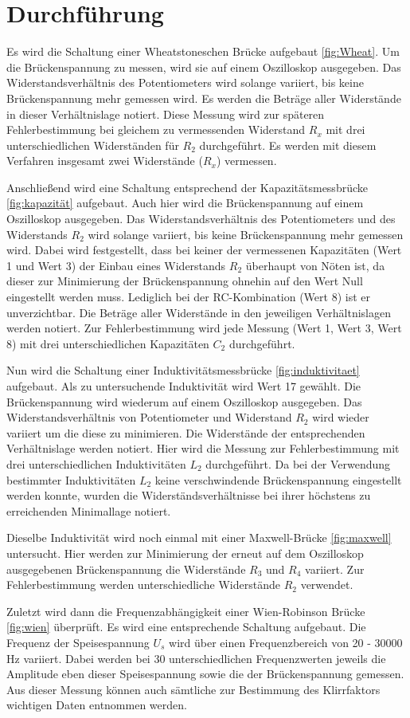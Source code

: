 \section{Durchführung}
\label{sec:Durchführung}

Es wird die Schaltung einer Wheatstoneschen Brücke aufgebaut \ref{fig:Wheat}.
Um die Brückenspannung zu messen, wird sie auf einem Oszilloskop ausgegeben.
Das Widerstandsverhältnis des Potentiometers wird solange variiert, bis keine
Brückenspannung mehr gemessen wird. Es werden die Beträge aller Widerstände in
dieser Verhältnislage notiert. Diese Messung wird zur späteren Fehlerbestimmung bei gleichem zu
vermessenden Widerstand $R_x$ mit drei unterschiedlichen Widerständen für $R_2$ durchgeführt.
Es werden mit diesem Verfahren insgesamt zwei Widerstände ($R_x$) vermessen.

Anschließend wird eine Schaltung entsprechend der Kapazitätsmessbrücke \ref{fig:kapazität}
aufgebaut. Auch hier wird die Brückenspannung auf einem Oszilloskop ausgegeben.
Das Widerstandsverhältnis des Potentiometers und des Widerstands $R_2$ wird solange variiert, bis keine
Brückenspannung mehr gemessen wird. Dabei wird festgestellt, dass bei keiner der
vermessenen Kapazitäten (Wert 1 und Wert 3) der Einbau eines Widerstands $R_2$
überhaupt von Nöten ist, da dieser zur Minimierung der Brückenspannung ohnehin auf
den Wert Null eingestellt werden muss. Lediglich bei der RC-Kombination (Wert 8)
ist er unverzichtbar. Die Beträge aller Widerstände in den jeweiligen Verhältnislagen
werden notiert. Zur Fehlerbestimmung wird jede Messung (Wert 1, Wert 3, Wert 8)
mit drei unterschiedlichen Kapazitäten $C_2$ durchgeführt.

Nun wird die Schaltung einer Induktivitätsmessbrücke \ref{fig:induktivitaet} aufgebaut.
Als zu untersuchende Induktivität wird Wert 17 gewählt.
Die Brückenspannung wird wiederum auf einem Oszilloskop ausgegeben.
Das Widerstandsverhältnis von Potentiometer und Widerstand $R_2$ wird wieder
variiert um die diese zu minimieren. Die Widerstände der entsprechenden
Verhältnislage werden notiert. Hier wird die Messung zur Fehlerbestimmung mit
drei unterschiedlichen Induktivitäten $L_2$ durchgeführt.
Da bei der Verwendung bestimmter Induktivitäten $L_2$ keine verschwindende
Brückenspannung eingestellt werden konnte, wurden die Widerständsverhältnisse
bei ihrer höchstens zu erreichenden Minimallage notiert.

Dieselbe Induktivität wird noch einmal mit einer Maxwell-Brücke \ref{fig:maxwell} untersucht.
Hier werden zur Minimierung der erneut auf dem Oszilloskop ausgegebenen Brückenspannung
die Widerstände $R_3$ und $R_4$ variiert. Zur Fehlerbestimmung werden unterschiedliche
Widerstände $R_2$ verwendet.

Zuletzt wird dann die Frequenzabhängigkeit einer Wien-Robinson Brücke \ref{fig:wien}
überprüft. Es wird eine entsprechende Schaltung aufgebaut. Die Frequenz der
Speisespannung $U_s$ wird über einen Frequenzbereich von 20 - 30000 Hz variiert.
Dabei werden bei 30 unterschiedlichen Frequenzwerten jeweils die Amplitude eben dieser
Speisespannung sowie die der Brückenspannung gemessen. Aus dieser Messung können
auch sämtliche zur Bestimmung des Klirrfaktors wichtigen Daten entnommen werden.
